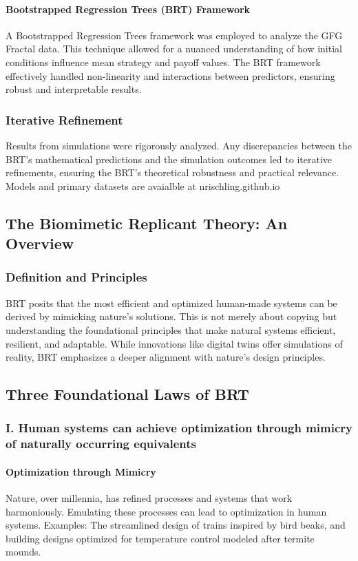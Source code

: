 \documentclass[sn-nature]{sn-jnl}%
\theoremstyle{thmstyleone}%
\theoremstyle{thmstyletwo}%
\theoremstyle{thmstylethree}%
\begin{document}
\paragraph{Bootstrapped Regression Trees (BRT) Framework}
A Bootstrapped Regression Trees framework was employed to analyze the GFG Fractal data. This technique allowed for a nuanced understanding of how initial conditions influence mean strategy and payoff values. The BRT framework effectively handled non-linearity and interactions between predictors, ensuring robust and interpretable results.





\subsubsection{Iterative Refinement}

Results from simulations were rigorously analyzed. Any discrepancies between the BRT's mathematical predictions and the simulation outcomes led to iterative refinements, ensuring the BRT's theoretical robustness and practical relevance. Models and primary datasets are avaialble at nrischling.github.io
\subsection{The Biomimetic Replicant Theory: An Overview}
\subsubsection{Definition and Principles}
BRT posits that the most efficient and optimized human-made systems can be derived by mimicking nature's solutions. This is not merely about copying but understanding the foundational principles that make natural systems efficient, resilient, and adaptable\cite{leibold_community_2017}. While innovations like digital twins offer simulations of reality, BRT emphasizes a deeper alignment with nature's design principles\cite{tao_digital_2018}.
\subsection{Three Foundational Laws of BRT}
\subsubsection*{I. Human systems can achieve optimization through mimicry of naturally occurring equivalents }
\paragraph{Optimization through Mimicry}
Nature, over millennia, has refined processes and systems that work harmoniously. Emulating these processes can lead to optimization in human systems\cite{benyus_biomimicry_2009}.
Examples: The streamlined design of trains inspired by bird beaks, and building designs optimized for temperature control modeled after termite mounds.
\end{document}

